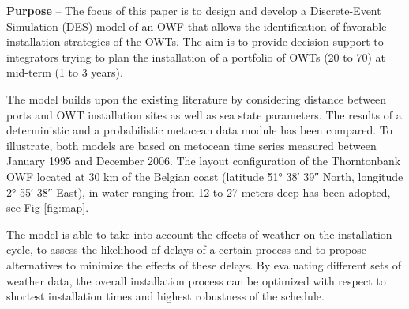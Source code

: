 \textbf{Purpose} --
The focus of this paper is to design and develop a Discrete-Event Simulation (DES) model of an OWF that allows the identification of favorable installation strategies of the OWTs. The aim is to provide decision support to integrators trying to plan the installation of a portfolio of OWTs (20 to 70) at mid-term (1 to 3 years).


The model builds upon the existing literature by considering distance between ports and OWT installation sites as well as sea state parameters. The results of a deterministic and a probabilistic metocean data module has been compared. To illustrate, both models are based on metocean time series measured between January 1995 and December 2006. The layout configuration of the Thorntonbank OWF located at 30 km of the Belgian coast (latitude 51° 38′ 39″ North, longitude 2° 55′ 38″ East), in water ranging from 12 to 27 meters deep has been adopted, see Fig \ref{fig:map}.

The model is able to take into account the effects of weather on the installation cycle, to assess the likelihood of delays of a certain process and to propose alternatives to minimize the effects of these delays. By evaluating different sets of weather data, the overall installation process can be optimized with respect to shortest installation times and highest robustness of the schedule. %


